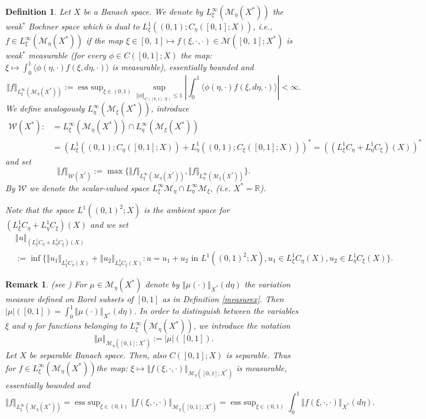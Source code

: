 \documentclass[10pt]{article}
\newtheorem{defi}{Definition}
\newtheorem{remark}{Remark}
\DeclareMathOperator*{\esssup}{ess~sup}
\newcommand*{\norm}[1]{\left\Vert{#1}\right\Vert}
\newcommand*{\abs}[1]{\left\vert{#1}\right\vert}
\newcommand{\R}{\mathbb{R}}
\newcommand{\izj}{\int_{0}^{1}}
\newcommand{\W}{\mathcal{W}}
\begin{document}
\begin{defi}\label{space}
Let $X$ be a Banach space. We denote by  $L^\infty_\xi(\mathcal{M}_\eta(X^*))$ the weak$^*$ Bochner space which is dual  to $L^1_\xi((0,1); C_\eta([0,1];X))$, i.e., $f\in L^\infty_\xi(\mathcal{M}_\eta(X^*))$  if the map  $\xi\in [0,\ 1]\mapsto f(\xi,\cdot,\cdot)\in \mathcal{M}([0,\ 1];X^*)$ is  weak$^*$ measurable (for every $\phi \in C([0,1];X)$ the map: $ 
\xi\mapsto \izj \langle\phi(\eta,\cdot)f(\xi,d\eta,\cdot)\rangle$ is measurable), essentially bounded and
\[
\Vert f\Vert_{L^\infty_\xi(\mathcal{M}_\eta(X^{*}))}:=\esssup_{\xi\in (0, 1)}\sup_{\Vert \phi\Vert_{C([0, 1];X)}\leq 1}\abs{\izj \langle\phi(\eta,\cdot)f(\xi,d\eta,\cdot)\rangle} < \infty.
\]
We define analogously $L^\infty_\eta(\mathcal{M}_\xi(X^*))$, introduce 
\begin{align*}
   \W(X^*): &= L^\infty_\xi(\mathcal{M}_\eta(X^*))\cap L^\infty_\eta(\mathcal{M}_\xi(X^*))\\
   &=(L^1_\xi((0,1); C_\eta([0,1];X)) + L^1_\eta((0,1); C_\xi([0,1];X)))^{*} = ((L^1_\xi C_\eta + L^1_\eta C_\xi)(X))^{*}
\end{align*}
and set 
\[
\norm{f}_{\W(X^{*})} :=\max\{\Vert f\Vert_{L^\infty_\xi(\mathcal{M}_\eta(X^{*}))}, \Vert f\Vert_{L^\infty_\eta(\mathcal{M}_\xi(X^{*}))}\}.
\]
By $\W$ we denote the scalar-valued space $L^{\infty}_\xi\mathcal{M}_\eta  \cap L^{\infty}_\eta\mathcal{M}_\xi$, (i.e. $X^*=\R$).

Note that the space $L^{1}((0,1)^2;X)$ is the ambient space for $(L^1_\xi C_\eta + L^1_\eta C_\xi)(X)$ and we set 
\begin{align*}
&\norm{u}_{(L^1_\xi C_\eta + L^1_\eta C_\xi)(X)}\\
&:= \inf\{\norm{u_1}_{L^1_\xi C_\eta(X)} + \norm{u_2}_{L^1_\eta C_\xi(X)}: u = u_1+u_2 \textrm{ in }L^{1}((0,1)^2;X), u_1 \in L^1_\xi C_\eta(X), u_2 \in L^1_\eta C_\xi(X) \}.
\end{align*}
\end{defi}

\begin{remark}(see \cite[page 683]{JPS2025})
For $\mu \in \mathcal{M}_\eta(X^*)$ denote by $\norm{\mu(\cdot)}_{X^*}(d\eta)$ the variation measure defined on Borel subsets of $[0,1]$ as in Definition \ref{measurex}. Then $\abs{\mu}([0,1]) = \izj \norm{\mu(\cdot)}_{X^*}(d\eta)$. In order to distinguish between the variables $\xi$ and $\eta$ for functions belonging to  $L^{\infty}_{\xi}(\mathcal{M}_\eta(X^*))$, we introduce the notation
\[
\norm{\mu}_{\mathcal{M}_{\eta}([0,1];X^*)}:= \abs{\mu}([0,1]).
\]
Let $X$ be separable Banach space. Then, also $C([0,1];X)$ is separable.  
Thus for $f \in L^{\infty}_{\xi}(\mathcal{M}_\eta(X^*))$the map: $
\xi \mapsto \norm{f(\xi,\cdot,\cdot)}_{\mathcal{M}_{\eta}([0,1];X^{*})}$ is measurable, essentially bounded and 
\[
\norm{f}_{L^{\infty}_{\xi}(\mathcal{M}_\eta(X^{*}))} = \esssup_{\xi\in (0,1)}\norm{f(\xi,\cdot,\cdot)}_{\mathcal{M}_\eta([0,1];X^{*})} = \esssup_{\xi\in (0,1)}\izj \norm{f(\xi,\cdot,\cdot)}_{X^{*}}(d\eta).
\]
\end{remark}
\end{document}
